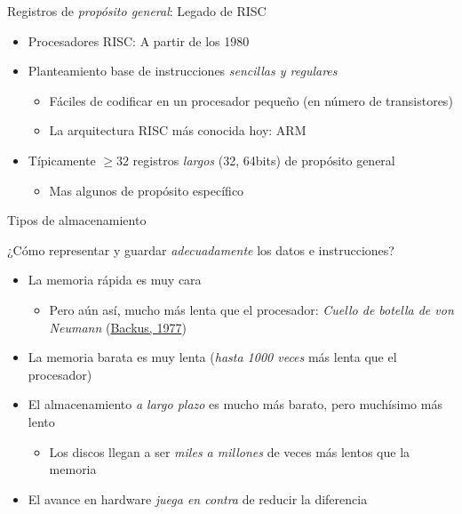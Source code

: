 \documentclass[presentation]{beamer}
\begin{document}
\begin{frame}[label={sec:orge097357}]{Registros de \emph{propósito general}: Legado de RISC}
\begin{itemize}
\item Procesadores RISC: A partir de los 1980
\item Planteamiento base de instrucciones \emph{sencillas y regulares}
\begin{itemize}
\item Fáciles de codificar en un procesador pequeño (en número de
transistores)
\item La arquitectura RISC más conocida hoy: ARM
\end{itemize}
\item Típicamente \(\ge 32\) registros \emph{largos} (32, 64bits) de propósito
general
\begin{itemize}
\item Mas algunos de propósito específico
\end{itemize}
\end{itemize}
\end{frame}

\begin{frame}[label={sec:org844212c}]{Tipos de almacenamiento}
\begin{center}
¿Cómo representar y guardar \emph{adecuadamente} los datos e instrucciones?
\end{center}
\begin{itemize}
\item La memoria rápida es muy cara
\begin{itemize}
\item Pero aún así, mucho más lenta que el procesador: \emph{Cuello de
botella de von Neumann} (\href{https://dl.acm.org/citation.cfm?doid=359576.359579}{Backus, 1977})
\end{itemize}
\item La memoria barata es muy lenta (\emph{hasta 1000 veces} más lenta que el procesador)
\item El almacenamiento \emph{a largo plazo} es mucho más barato, pero
muchísimo más lento
\begin{itemize}
\item Los discos llegan a ser \emph{miles a millones} de veces más lentos que
la memoria
\end{itemize}
\item El avance en hardware \emph{juega en contra} de reducir la diferencia
\end{itemize}
\end{frame}
\end{document}
